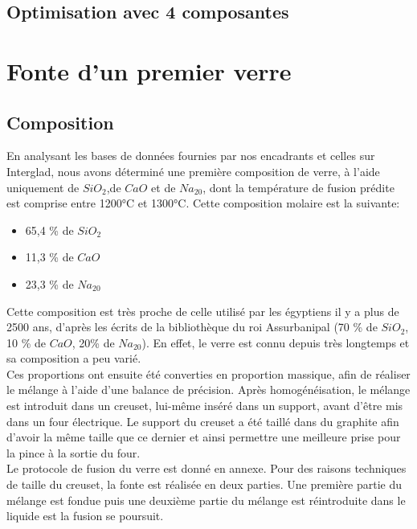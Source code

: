 \documentclass{article}
\begin{document}
\subsection{Optimisation avec 4 composantes}

\section{Fonte d'un premier verre}

\subsection{Composition}

En analysant les bases de données fournies par nos encadrants et celles sur Interglad, nous avons déterminé une première composition de verre, à l'aide uniquement de $SiO_2$,de $CaO$ et de $Na_20$, dont la température de fusion prédite est comprise entre 1200°C et 1300°C. Cette composition molaire est la suivante:

\begin{itemize}
    \item 65,4 \% de $SiO_2$
    \item 11,3 \% de $CaO$
    \item 23,3 \% de $Na_20$
\end{itemize}

Cette composition est très proche de celle utilisé par les égyptiens il y a plus de 2500 ans, d’après les écrits de la bibliothèque du roi Assurbanipal (70 \% de $SiO_2$, 10 \% de $CaO$, 20\% de $Na_20$). En effet, le verre est connu depuis très longtemps et sa composition a peu varié. \\

Ces proportions ont ensuite été converties en proportion massique, afin de réaliser le mélange à l’aide d’une balance de précision. Après homogénéisation, le mélange est introduit dans un creuset, lui-même inséré dans un support, avant d’être mis dans un four électrique. Le support du creuset a été taillé dans du graphite afin d’avoir la même taille que ce dernier et ainsi permettre une meilleure prise pour la pince à la sortie du four.\\

Le protocole de fusion du verre est donné en annexe. Pour des raisons techniques de taille du creuset, la fonte est réalisée en deux parties. Une première partie du mélange est fondue puis une deuxième partie du mélange est réintroduite dans le liquide est la fusion se poursuit.\\
\end{document}
